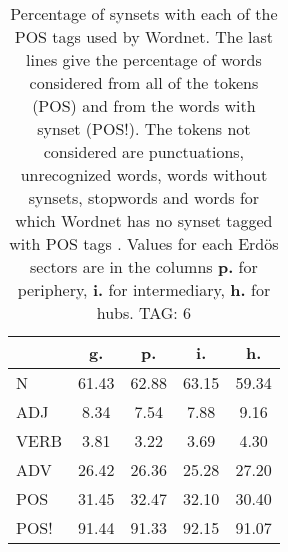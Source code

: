 \begin{table}[h!]
\begin{center}
\begin{tabular}{| l | c | c | c | c |}\hline
 & g. & p. & i. & h. \\\hline
N & 61.43  & 62.88  & 63.15  & 59.34 \\\hline
ADJ & 8.34  & 7.54  & 7.88  & 9.16 \\\hline
VERB & 3.81  & 3.22  & 3.69  & 4.30 \\\hline
ADV & 26.42  & 26.36  & 25.28  & 27.20 \\\hline
POS & 31.45  & 32.47  & 32.10  & 30.40 \\\hline
POS! & 91.44  & 91.33  & 92.15  & 91.07 \\\hline
\end{tabular}
\caption{Percentage of synsets with each of the POS tags used by Wordnet. The last lines give the percentage of words considered from all of the tokens (POS) and from the words with synset (POS!). The tokens not considered are punctuations, unrecognized words, words without synsets, stopwords and words for which Wordnet has no synset  tagged with POS tags . Values for each Erd\"os sectors are in the columns {{\bf p.}} for periphery, {{\bf i.}} for intermediary, {{\bf h.}} for hubs. TAG: 6}
\end{center}
\end{table}